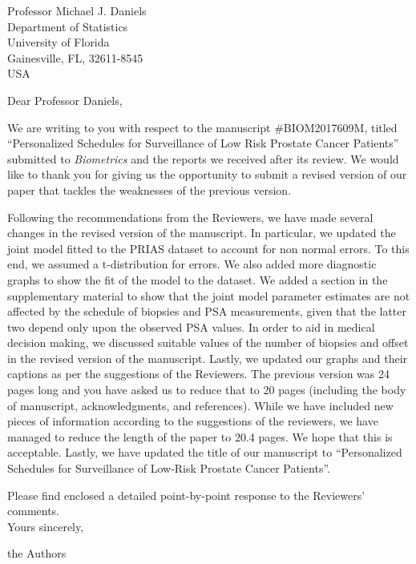 \documentclass[a4paper, 11pt]{letter}
\begin{document}
\begin{letter}{Professor Michael J. Daniels\\
Department of Statistics\\
University of Florida\\
Gainesville, FL, 32611-8545\\
USA}

\address{Department of Biostatistics\\
Erasmus University Medical Center\\PO Box 2040, 3000 CA Rotterdam\\ the Netherlands
}

\opening{Dear Professor Daniels,}

We are writing to you with respect to the manuscript \#BIOM2017609M, titled ``Personalized Schedules for Surveillance of Low Risk Prostate Cancer Patients'' submitted to \emph{Biometrics} and the reports we received after its review. We would like to thank you for giving us the opportunity to submit a revised version of our paper that tackles the weaknesses of the previous version.

Following the recommendations from the Reviewers, we have made several changes in the revised version of the manuscript. In particular, we updated the joint model fitted to the PRIAS dataset to account for non normal errors. To this end, we assumed a t-distribution for errors. We also added more diagnostic graphs to show the fit of the model to the dataset. We added a section in the supplementary material to show that the joint model parameter estimates are not affected by the schedule of biopsies and PSA measurements, given that the latter two depend only upon the observed PSA values. In order to aid in medical decision making, we discussed suitable values of the number of biopsies and offset in the revised version of the manuscript. Lastly, we updated our graphs and their captions as per the suggestions of the Reviewers. The previous version was 24 pages long and you have asked us to reduce that to 20 pages (including the body of manuscript, acknowledgments, and references). While we have included new pieces of information according to the suggestions of the reviewers,  we have managed to reduce the length of the paper to 20.4 pages. We hope that this is acceptable. Lastly, we have updated the title of our manuscript to ``Personalized Schedules for Surveillance of Low-Risk Prostate Cancer Patients''.

Please find enclosed a detailed point-by-point response to the Reviewers' comments.\\

Yours sincerely,

the Authors



\end{letter}
\end{document}
